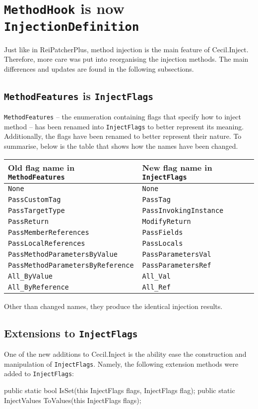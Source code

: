 \documentclass[a4paper,11pt]{article}
\newcommand{\CecilInject}{\textsc{C}{\scriptsize \sc ecil}.\textsc{I}{\scriptsize \sc nject}}
\begin{document}
\section{\texttt{MethodHook} is now \texttt{InjectionDefinition}}
Just like in ReiPatcherPlus, method injection is the main feature of \CecilInject{}. Therefore, more care was put into reorganising the injection methods. The main differences and updates are found in the following subsections.

\subsection{\texttt{MethodFeatures} is \texttt{InjectFlags}}
\texttt{MethodFeatures} -- the enumeration containing flags that specify how to inject method -- has been renamed into \texttt{InjectFlags} to better represent its meaning. Additionally, the flags have been renamed to better represent their nature. To summarise, below is the table that shows how the names have been changed.
\begin{center}
\begin{tabular}{|l|l|}
\hline
Old flag name in \texttt{MethodFeatures} & New flag name in \texttt{InjectFlags} \\ \hline
\texttt{None} & \texttt{None} \\ \hline
\texttt{PassCustomTag} & \texttt{PassTag} \\ \hline
\texttt{PassTargetType} & \texttt{PassInvokingInstance} \\ \hline
\texttt{PassReturn} & \texttt{ModifyReturn} \\ \hline
\texttt{PassMemberReferences} & \texttt{PassFields} \\ \hline
\texttt{PassLocalReferences} & \texttt{PassLocals} \\ \hline
\texttt{PassMethodParametersByValue} & \texttt{PassParametersVal} \\ \hline
\texttt{PassMethodParametersByReference} & \texttt{PassParametersRef} \\ \hline
\texttt{All\_ByValue} & \texttt{All\_Val} \\ \hline
\texttt{All\_ByReference} & \texttt{All\_Ref} \\ \hline
\end{tabular}
\end{center}
Other than changed names, they produce the identical injection results.

\subsection{Extensions to \texttt{InjectFlags}}
One of the new additions to \CecilInject{} is the ability ease the construction and manipulation of \texttt{InjectFlags}. Namely, the following extension methods were added to \texttt{InjectFlags}:
\begin{cs}
public static bool IsSet(this InjectFlags flags, InjectFlags flag);
public static InjectValues ToValues(this InjectFlags flags);
\end{cs}
\end{document}
